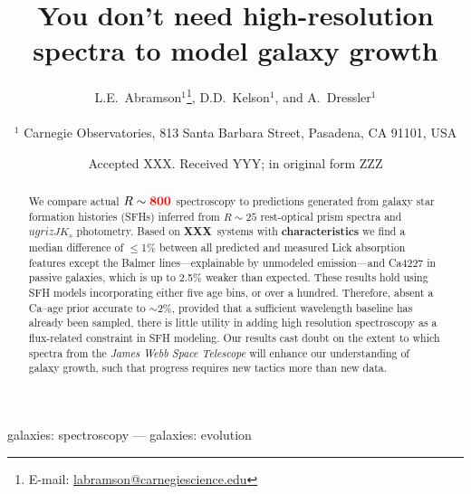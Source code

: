 \documentclass[a4paper,fleqn,usenatbib]{mnras}
\title[More is not better]{You don't need high-resolution spectra to model galaxy growth}
\author[Abramson, Kelson, \& Dressler]{L.E.~Abramson$^{1}$\thanks{E-mail: \href{mailto:labramson@carnegiescience.edu}{labramson@carnegiescience.edu}},
D.D.~Kelson$^{1}$,
and A.~Dressler$^{1}$
\\
\\
$^1$	Carnegie Observatories, 813 Santa Barbara Street, Pasadena, CA 91101, USA\\
}
\date{Accepted XXX. Received YYY; in original form ZZZ}
\newcommand{\Mstel}{M_\ast}
\newcommand{\bfr}{\bf\color{red}}
\newcommand{\ntot}{{\bfr XXX}} %
\begin{document}
\label{firstpage}
\pagerange{\pageref{firstpage}--\pageref{lastpage}}
\maketitle

\begin{abstract}

	We compare actual $R\sim{\bfr 800}$ spectroscopy to predictions generated from galaxy 
	star formation histories (SFHs) inferred from $R\sim25$ rest-optical prism spectra 
	and $ugrizJK_{s}$ photometry. Based on \ntot\ systems with {\bfr characteristics} 
	we find a median difference of 
	$\leq$1\% between all predicted and measured Lick absorption features except the Balmer 
	lines---explainable by unmodeled emission---and Ca4227 in passive galaxies, 
	which is up to 2.5\% weaker than expected. These results hold using SFH models incorporating 
	either five age bins, or over a hundred. Therefore, absent a Ca--age prior accurate to 
	$\sim$2\%, provided that a sufficient wavelength baseline has already been sampled, 
	there is little utility in adding high resolution spectroscopy as a flux-related 
	constraint in SFH modeling. 
	Our results cast doubt on the extent to which 
	spectra from the {\it James Webb Space Telescope} will enhance our understanding of 
	galaxy growth, such that progress requires new tactics more than new data.

\end{abstract}

\begin{keywords}
	galaxies: spectroscopy --- galaxies: evolution
\end{keywords}

\end{document}
